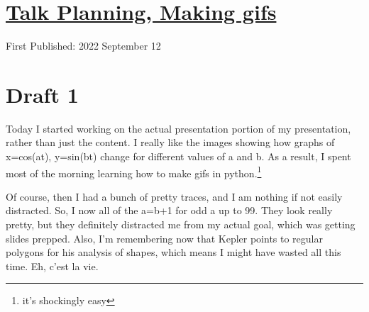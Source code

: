\documentclass[12pt]{article}[titlepage]
\newcommand{\1}{\={a}}
\newcommand{\2}{\={e}}
\newcommand{\3}{\={\i}}
\newcommand{\4}{\=o}
\newcommand{\5}{\=u}
\newcommand{\6}{\={A}}
\renewcommand{\,}{\textsuperscript{,}}
\begin{document}
\doublespacing
\section{\href{talk-planning-4.html}{Talk Planning, Making gifs}}
First Published: 2022 September 12
\section{Draft 1}
Today I started working on the actual presentation portion of my presentation, rather than just the content.
I really like the images showing how graphs of x=cos(at), y=sin(bt) change for different values of a and b.
As a result, I spent most of the morning learning how to make gifs in python.\footnote{it's shockingly easy}

Of course, then I had a bunch of pretty traces, and I am nothing if not easily distracted.
So, I now all of the a=b+1 for odd a up to 99.
They look really pretty, but they definitely distracted me from my actual goal, which was getting slides prepped.
Also, I'm remembering now that Kepler points to regular polygons for his analysis of shapes, which means I might have wasted all this time.
Eh, c'est la vie.
\end{document}
